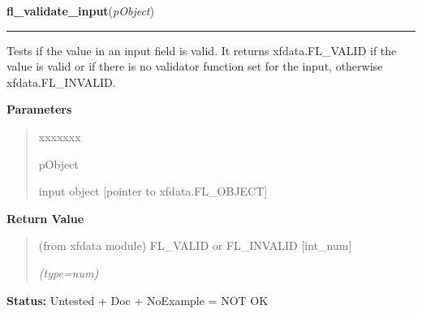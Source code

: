 \hspace{.8\funcindent}\begin{boxedminipage}{\funcwidth}

    \raggedright \textbf{fl\_validate\_input}(\textit{pObject})

    \vspace{-1.5ex}

    \rule{\textwidth}{0.5\fboxrule}
\setlength{\parskip}{2ex}
    Tests if the value in an input field is valid. It returns 
    xfdata.FL\_VALID if the value is valid or if there is no validator 
    function set for the input, otherwise xfdata.FL\_INVALID.

\setlength{\parskip}{1ex}
      \textbf{Parameters}
      \vspace{-1ex}

      \begin{quote}
        \begin{Ventry}{xxxxxxx}

          \item[pObject]

          input object [pointer to xfdata.FL\_OBJECT]

        \end{Ventry}

      \end{quote}

      \textbf{Return Value}
    \vspace{-1ex}

      \begin{quote}
      (from xfdata module) FL\_VALID or FL\_INVALID [int\_num]

      {\it (type=num)}

      \end{quote}

\textbf{Status:} Untested + Doc + NoExample = NOT OK



    \end{boxedminipage}

    \label{xformslib:library:fl_set_object_shortcut}

    \vspace{0.5ex}

